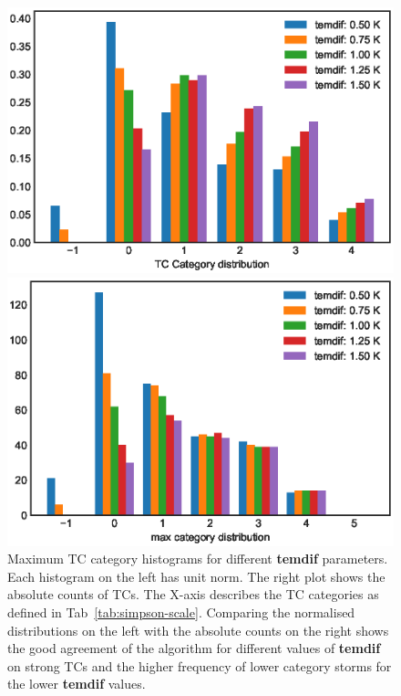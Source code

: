 \begin{figure}[!htb]
	\begin{minipage}[t]{0.48\textwidth}
		\includegraphics[width = \textwidth]{img/max_cat_distr_temdifs.eps}
	\end{minipage}
	\hfill
	\begin{minipage}[t]{0.48\textwidth}
		\includegraphics[width = \textwidth]{img/max_cat_counts_temdifs.eps}
	\end{minipage}
	\caption{Maximum TC category histograms for different \textbf{temdif} parameters. Each histogram on the left has unit norm. The right plot shows the absolute counts of TCs. The X-axis describes the TC categories as defined in Tab~\ref{tab:simpson-scale}. Comparing the normalised distributions on the left with the absolute counts on the right shows the good agreement of the algorithm for different values of \textbf{temdif} on strong TCs and the higher frequency of lower category storms for the lower \textbf{temdif} values.}
	\label{fig:temdif-analysis}
\end{figure}

